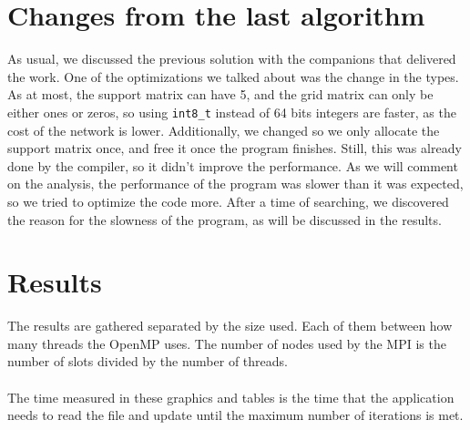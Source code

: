\documentclass[11pt, a4paper]{article}
\begin{document}
\section{Changes from the last algorithm}
As usual, we discussed the previous solution with the companions that delivered the work. One of the optimizations we talked about was the change in the types. As at most, the support matrix can have 5, and the grid matrix can only be either ones or zeros, so using \texttt{int8\_t} instead of 64 bits integers are faster, as the cost of the network is lower. Additionally, we changed so we only allocate the support matrix once, and free it once the program finishes. Still, this was already done by the compiler, so it didn't improve the performance. As we will comment on the analysis, the performance of the program was slower than it was expected, so we tried to optimize the code more. After a time of searching, we discovered the reason for the slowness of the program, as will be discussed in the results.

	\section{Results}
				The results are gathered separated by the size used. Each of them between how many threads the OpenMP uses. The number of nodes used by the MPI is the number of slots divided by the number of threads.
			\\
			\\
	The time measured in these graphics and tables is the time that the application needs to read the file and update until the maximum number of iterations is met.
	\newcommand{\speedup}[1]{
	\caption[Speedup #1]{Speedup table. There are two examples used in this process, both being square matrixes of #1 specifically.}
	\label{tab:speedup}\\
	
}
	\newcommand{\timetable}[1]{
\caption[Time #1]{Time table. There are two examples used in this process, both being square matrixes of #1 specifically.}
\label{tab:time}\\
	
}
\newcommand{\efficiency}[1]{
	\caption[Efficiency #1]{Efficiency table. There are two examples used in this process, both being square matrixes of #1 specifically.}
\label{tab:efficiency}\\
}
	
	
	
	
	
	
	
	
\end{document}
